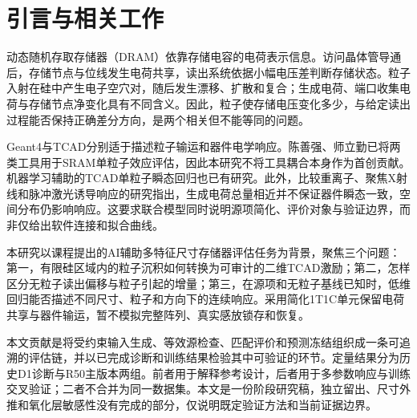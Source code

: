 \section{引言与相关工作}
动态随机存取存储器（DRAM）依靠存储电容的电荷表示信息。访问晶体管导通后，存储节点与位线发生电荷共享，读出系统依据小幅电压差判断存储状态\cite{keeth2001}。粒子入射在硅中产生电子空穴对，随后发生漂移、扩散和复合；生成电荷、端口收集电荷与存储节点净变化具有不同含义\cite{label1996}。因此，粒子使存储电压变化多少，与给定读出过程能否保持正确差分方向，是两个相关但不能等同的问题。

Geant4与TCAD分别适于描述粒子输运和器件电学响应。陈善强、师立勤已将两类工具用于SRAM单粒子效应评估\cite{chen2011}，因此本研究不将工具耦合本身作为首创贡献。机器学习辅助的TCAD单粒子瞬态回归也已有研究\cite{xu2021}。此外，比较重离子、聚焦X射线和脉冲激光诱导响应的研究指出，生成电荷总量相近并不保证器件瞬态一致，空间分布仍影响响应\cite{ryder2021}。这要求联合模型同时说明源项简化、评价对象与验证边界，而非仅给出软件连接和拟合曲线。

本研究以课程提出的AI辅助多特征尺寸存储器评估任务为背景\cite{course}，聚焦三个问题：第一，有限硅区域内的粒子沉积如何转换为可审计的二维TCAD激励；第二，怎样区分无粒子读出偏移与粒子引起的增量；第三，在源项和无粒子基线已知时，低维回归能否描述不同尺寸、粒子和方向下的连续响应。采用简化1T1C单元保留电荷共享与器件输运，暂不模拟完整阵列、真实感放锁存和恢复。

本文贡献是将受约束输入生成、等效源检查、匹配评价和预测冻结组织成一条可追溯的评估链，并以已完成诊断和训练结果检验其中可验证的环节。定量结果分为历史D1诊断与R50主版本两组。前者用于解释参考设计，后者用于多参数响应与训练交叉验证；二者不合并为同一数据集。本文是一份阶段研究稿，独立留出、尺寸外推和氧化层敏感性没有完成的部分，仅说明既定验证方法和当前证据边界。

